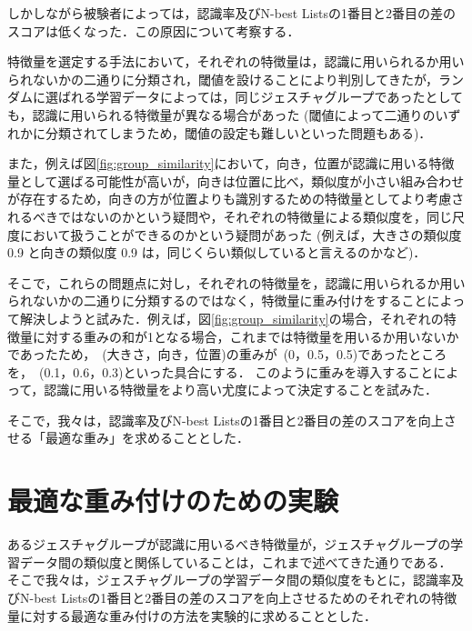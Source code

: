 しかしながら被験者によっては，認識率及びN-best Listsの1番目と2番目の差のスコアは低くなった．この原因について考察する．

特徴量を選定する手法において，それぞれの特徴量は，認識に用いられるか用いられないかの二通りに分類され，閾値を設けることにより判別してきたが，ランダムに選ばれる学習データによっては，同じジェスチャグループであったとしても，認識に用いられる特徴量が異なる場合があった (閾値によって二通りのいずれかに分類されてしまうため，閾値の設定も難しいといった問題もある)．

また，例えば図\ref{fig:group_similarity}において，向き，位置が認識に用いる特徴量として選ばる可能性が高いが，向きは位置に比べ，類似度が小さい組み合わせが存在するため，向きの方が位置よりも識別するための特徴量としてより考慮されるべきではないのかという疑問や，それぞれの特徴量による類似度を，同じ尺度において扱うことができるのかという疑問があった (例えば，大きさの類似度 0.9 と向きの類似度 0.9 は，同じくらい類似していると言えるのかなど)．

そこで，これらの問題点に対し，それぞれの特徴量を，認識に用いられるか用いられないかの二通りに分類するのではなく，特徴量に重み付けをすることによって解決しようと試みた．例えば，図\ref{fig:group_similarity}の場合，それぞれの特徴量に対する重みの和が1となる場合，これまでは特徴量を用いるか用いないかであったため，~(大きさ，向き，位置)の重みが~(0，0.5，0.5)であったところを，~(0.1，0.6，0.3)といった具合にする．
このように重みを導入することによって，認識に用いる特徴量をより高い尤度によって決定することを試みた．

そこで，我々は，認識率及びN-best Listsの1番目と2番目の差のスコアを向上させる「最適な重み」を求めることとした．


\section{最適な重み付けのための実験}
あるジェスチャグループが認識に用いるべき特徴量が，ジェスチャグループの学習データ間の類似度と関係していることは，これまで述べてきた通りである．
そこで我々は，ジェスチャグループの学習データ間の類似度をもとに，認識率及びN-best Listsの1番目と2番目の差のスコアを向上させるためのそれぞれの特徴量に対する最適な重み付けの方法を実験的に求めることとした．

